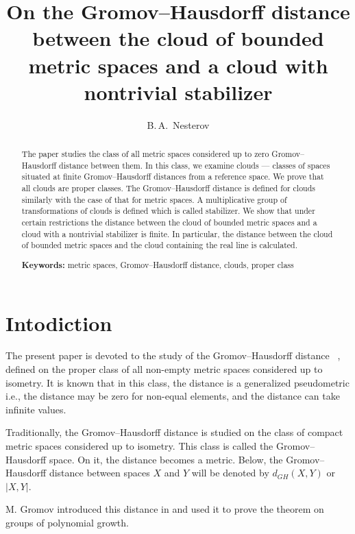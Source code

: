 \documentclass[leqno]{article}
\begin{document}
\title{On the Gromov--Hausdorff distance between the cloud of bounded
metric spaces and a cloud with nontrivial stabilizer}
\author{B.\,A.~Nesterov}
\date{}
\maketitle

\begin{abstract}
The paper studies the class of all metric spaces considered up to zero Gromov--Hausdorff distance between them. In this class, we examine clouds --- classes of spaces situated at finite Gromov--Hausdorff distances from a reference space. We prove that all clouds are proper classes. The Gromov--Hausdorff distance is defined for clouds similarly with the case of that for metric spaces. A multiplicative group of transformations of clouds is defined which is called stabilizer. 
    We show that under certain restrictions the distance between the cloud of bounded metric spaces and a cloud with a nontrivial stabilizer is finite. In particular, the distance between the cloud of bounded metric spaces and the cloud containing the real line is calculated.
    
{\bf Keywords:} metric spaces, Gromov--Hausdorff distance, clouds, proper class
\end{abstract}

\section{Intodiction}

The present paper is devoted to the study of the Gromov--Hausdorff distance ~\cite{Edwards, Gromov81, Gromov99},
defined on the proper class of all non-empty metric spaces considered up to isometry. It is known that in this class, the distance is a generalized pseudometric i.e., the distance may be zero for non-equal elements, and the distance can take infinite values.  

Traditionally, the Gromov--Hausdorff distance is studied on the class of compact metric spaces considered up to isometry. This class is called the Gromov--Hausdorff space. On it, the distance becomes a metric. Below, the Gromov--Hausdorff distance between spaces $ X $ and $ Y $ will be denoted by $ d_{GH}(X, Y) $ or $ |X, Y| $.

M. Gromov introduced this distance in \cite{Gromov81} and used it to prove the theorem on groups of polynomial growth.  
\end{document}
